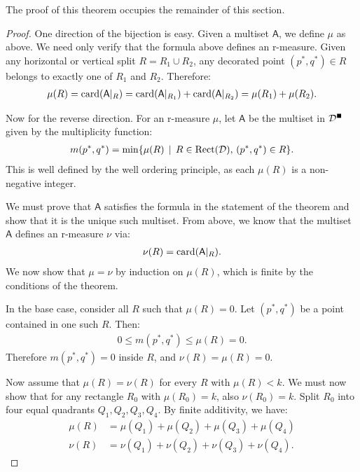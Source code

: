 The proof of this theorem occupies the remainder of this section. 

\begin{proof}
One direction of the bijection is easy. Given a multiset $\mathsf{A}$, we define $\mu$ as above. We need only verify that the formula above defines an r-measure. Given any horizontal or vertical split $R = R_1 \cup R_2$, any decorated point $(p^*, q^*) \in R$ belongs to exactly one of $R_1$ and $R_2$. Therefore:
\begin{align*}
\mu(R) = \operatorname{card}(\mathsf{A}|_R) = \operatorname{card}(\mathsf{A}|_{R_1}) + \operatorname{card}(\mathsf{A}|_{R_2}) = \mu(R_1) + \mu(R_2).
\end{align*}

Now for the reverse direction. For an r-measure $\mu$, let $\mathsf{A}$ be the multiset in $\mathcal{D}^\rint$ given by the multiplicity function:
\begin{align*}
m(p^*, q^*) = \min \{ \mu(R) \, \mid \, R \in \operatorname{Rect}(\mathcal{D}), \, (p^*, q^*) \in R \}.
\end{align*}
This is well defined by the well ordering principle, as each $\mu(R)$ is a non-negative integer.

We must prove that $\mathsf{A}$ satisfies the formula in the statement of the theorem and show that it is the unique such multiset. From above, we know that the multiset $\mathsf{A}$ defines an r-measure $\nu$ via:
\begin{align*}
\nu(R) = \operatorname{card}(\mathsf{A}|_R).
\end{align*}
We now show that $\mu = \nu$ by induction on $\mu(R)$, which is finite by the conditions of the theorem.

In the base case, consider all $R$ such that $\mu(R) = 0$. Let $(p^*, q^*)$ be a point contained in one such $R$. Then:
\begin{align*}
0 \leq m(p^*, q^*) \leq \mu(R) = 0.
\end{align*}
Therefore $m(p^*, q^*) = 0$ inside $R$, and $\nu(R) = \mu(R) = 0$.

Now assume that $\mu(R) = \nu(R)$ for every $R$ with $\mu(R) < k$. We must now show that for any rectangle $R_0$ with $\mu(R_0) = k$, also $\nu(R_0) = k$. Split $R_0$ into four equal quadrants $Q_1, Q_2, Q_3, Q_4$. By finite additivity, we have:
\begin{align*}
\mu(R) &= \mu(Q_1) + \mu(Q_2) + \mu(Q_3) + \mu(Q_4) \\
\nu(R) &= \nu(Q_1) + \nu(Q_2) + \nu(Q_3) + \nu(Q_4).
\end{align*}


\end{proof}
